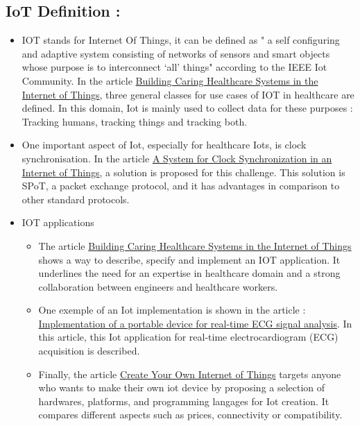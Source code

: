 \subsection{IoT Definition : }
  \begin{itemize}
  
      \item IOT stands for Internet Of Things, it can be defined as " a self configuring and adaptive system consisting of networks of sensors and smart objects whose purpose is to interconnect ‘all’ things" according to the IEEE Iot Community. In the article \uline{Building Caring Healthcare Systems in the Internet of Things}, three general classes for use cases of IOT in healthcare are defined. In this domain, Iot is mainly used to collect data for these purposes : Tracking humans, tracking things and tracking both.

      \item One important aspect of Iot, especially for healthcare Iots, is clock synchronisation. In the article \uline{A System for Clock Synchronization in an Internet of Things}, a solution is proposed for this challenge. This solution is SPoT, a packet exchange protocol, and it has advantages in comparison to other standard protocols.

      \item IOT applications\newline
      \begin{itemize}
        \item The article \uline{Building Caring Healthcare Systems
        in the Internet of Things} shows a way to describe, specify and implement an IOT application. It underlines the need for an expertise in healthcare domain and         a strong collaboration between engineers and healthcare workers.
        \item One exemple of an Iot implementation is shown in the article : \uline{Implementation of a portable device for real-time ECG signal analysis}. In this             article, this Iot application for real-time
        electrocardiogram (ECG) acquisition is described.
        \item Finally, the article \uline{Create Your Own Internet of Things} targets anyone who wants to make their own iot device by proposing a selection of           hardwares, platforms, and programming langages for Iot creation. It compares different aspects such as prices, connectivity or compatibility.
      \end{itemize}
  \end{itemize}
